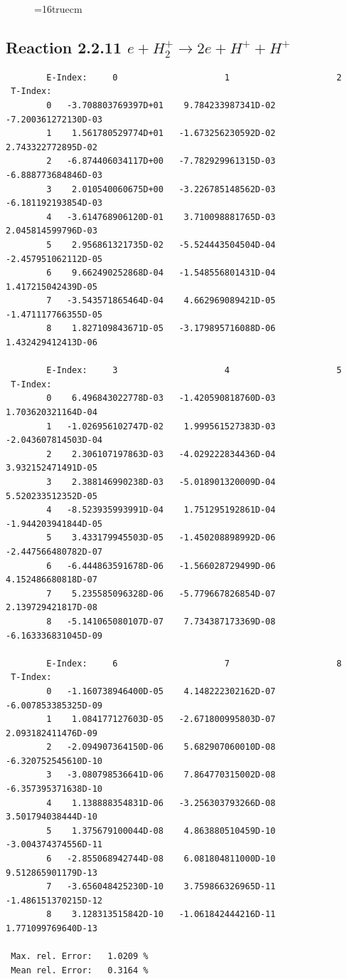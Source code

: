 \documentclass[12pt,dvips]{article}
\begin{document}
\begin{figure} \label{2.2.10}
\epsfxsize=16truecm
\end{figure}
\newpage



\subsection{
Reaction 2.2.11   $e + H_2^+      \rightarrow 2e + H^+ + H^+ $
}


\begin{small}\begin{verbatim}
        E-Index:     0                     1                     2
 T-Index:
        0   -3.708803769397D+01    9.784233987341D-02   -7.200361272130D-03
        1    1.561780529774D+01   -1.673256230592D-02    2.743322772895D-02
        2   -6.874406034117D+00   -7.782929961315D-03   -6.888773684846D-03
        3    2.010540060675D+00   -3.226785148562D-03   -6.181192193854D-03
        4   -3.614768906120D-01    3.710098881765D-03    2.045814599796D-03
        5    2.956861321735D-02   -5.524443504504D-04   -2.457951062112D-05
        6    9.662490252868D-04   -1.548556801431D-04    1.417215042439D-05
        7   -3.543571865464D-04    4.662969089421D-05   -1.471117766355D-05
        8    1.827109843671D-05   -3.179895716088D-06    1.432429412413D-06

        E-Index:     3                     4                     5
 T-Index:
        0    6.496843022778D-03   -1.420590818760D-03    1.703620321164D-04
        1   -1.026956102747D-02    1.999561527383D-03   -2.043607814503D-04
        2    2.306107197863D-03   -4.029222834436D-04    3.932152471491D-05
        3    2.388146990238D-03   -5.018901320009D-04    5.520233512352D-05
        4   -8.523935993991D-04    1.751295192861D-04   -1.944203941844D-05
        5    3.433179945503D-05   -1.450208898992D-06   -2.447566480782D-07
        6   -6.444863591678D-06   -1.566028729499D-06    4.152486680818D-07
        7    5.235585096328D-06   -5.779667826854D-07    2.139729421817D-08
        8   -5.141065080107D-07    7.734387173369D-08   -6.163336831045D-09

        E-Index:     6                     7                     8
 T-Index:
        0   -1.160738946400D-05    4.148222302162D-07   -6.007853385325D-09
        1    1.084177127603D-05   -2.671800995803D-07    2.093182411476D-09
        2   -2.094907364150D-06    5.682907060010D-08   -6.320752545610D-10
        3   -3.080798536641D-06    7.864770315002D-08   -6.357395371638D-10
        4    1.138888354831D-06   -3.256303793266D-08    3.501794038444D-10
        5    1.375679100044D-08    4.863880510459D-10   -3.004374374556D-11
        6   -2.855068942744D-08    6.081804811000D-10    9.512865901179D-13
        7   -3.656048425230D-10    3.759866326965D-11   -1.486151370215D-12
        8    3.128313515842D-10   -1.061842444216D-11    1.771099769640D-13

 Max. rel. Error:   1.0209 %
 Mean rel. Error:   0.3164 %

\end{verbatim}\end{small}
\end{document}
